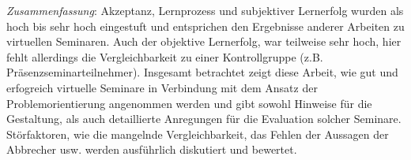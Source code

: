 \documentclass[12pt, bibliography=totoc]{scrartcl}
\begin{document}
\emph{Zusammenfassung}: Akzeptanz, Lernprozess und subjektiver
Lernerfolg wurden als hoch bis sehr hoch eingestuft und entsprichen den
Ergebnisse anderer Arbeiten zu virtuellen Seminaren. Auch der objektive
Lernerfolg, war teilweise sehr hoch, hier fehlt allerdings die
Vergleichbarkeit zu einer Kontrollgruppe (z.B.
Präsenzseminarteilnehmer). Insgesamt betrachtet zeigt diese Arbeit, wie
gut und erfogreich virtuelle Seminare in Verbindung mit dem Ansatz der
Problemorientierung angenommen werden und gibt sowohl Hinweise für die
Gestaltung, als auch detaillierte Anregungen für die Evaluation solcher
Seminare. Störfaktoren, wie die mangelnde Vergleichbarkeit, das Fehlen
der Aussagen der Abbrecher usw. werden ausführlich diskutiert und
bewertet.

\textbf{}
\end{document}
